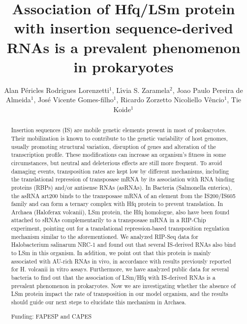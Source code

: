 \documentclass[twoside]{article}
\title{\vspace{-15mm}\fontsize{24pt}{10pt}\selectfont\textbf{Association of Hfq/LSm protein with insertion sequence-derived RNAs is a prevalent phenomenon in prokaryotes}} %
\author{Alan P\'ericles Rodrigues Lorenzetti$^1$, L\'{\i}via S. Zaramela$^2$, Joao Paulo Pereira de Almeida$^1$, Jos\'e Vicente Gomes-filho$^1$, Ricardo Zorzetto Nicoliello V\^encio$^1$, Tie Koide$^1$}
\affil{1 USP\\ 2 UNIVERSITY OF CALIFORNIA SAN DIEGO\\ }
\date{}
\begin{document}
\maketitle %

\thispagestyle{fancy} %


\begin{abstract}
Insertion sequences (IS) are mobile genetic elements present in most of prokaryotes. Their mobilization is known to contribute to the genetic variability of host genomes, usually promoting structural variation, disruption of genes and alteration of the transcription profile. These modifications can increase an organism's fitness in some circumstances, but neutral and deleterious effects are still more frequent. To avoid damaging events, transposition rates are kept low by different mechanisms, including the translational repression of transposase mRNA by its association with RNA binding proteins (RBPs) and/or antisense RNAs (asRNAs). In Bacteria (Salmonella enterica), the asRNA art200 binds to the transposase mRNA of an element from the IS200/IS605 family and can form a ternary complex with Hfq protein to prevent translation. In Archaea (Haloferax volcanii), LSm protein, the Hfq homologue, also have been found attached to sRNAs complementarily to a transposase mRNA in a RIP-Chip experiment, pointing out for a translational repression-based transposition regulation mechanism similar to the aforementioned. We analyzed RIP-Seq data for Halobacterium salinarum NRC-1 and found out that several IS-derived RNAs also bind to LSm in this organism. In addition, we point out that this protein is mainly associated with AU-rich RNAs in vivo, in accordance with results previously reported for H. volcanii in vitro assays. Furthermore, we have analyzed public data for several bacteria to find out that the association of LSm/Hfq with IS-derived RNAs is a prevalent phenomenon in prokaryotes. Now we are investigating whether the absence of LSm protein impact the rate of transposition in our model organism, and the results should guide our next steps to elucidate this mechanism in Archaea.

Funding: FAPESP and CAPES
\end{abstract}
\end{document}

